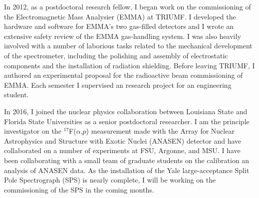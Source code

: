 {In %
 2012, as a postdoctoral research fellow, I began work on the commissioning of the Electromagnetic Mass Analysier (EMMA) %
 at TRIUMF. %
 I developed the hardware and software for 
 EMMA's two gas-filled detectors
and I wrote an extensive safety review of the EMMA gas-handling system. I was also heavily involved with a number of laborious tasks related to the mechanical development of the spectrometer, including the polishing and assembly of  electrostatic components and the installation of radiation shielding.
		Before leaving TRIUMF, I authored an experimental proposal for the radioactive beam commissioning of EMMA. Each semester I supervised an research project for an engineering student.
		
		
		In 2016, I joined the nuclear physics collaboration between Louisiana State and Florida State Universities as a senior postdoctoral researcher. I am the principle investigator on the $^{17}$F($\alpha$,$p$)  measurement made with the Array for Nuclear Astrophysics and Structure with Exotic Nuclei (ANASEN) detector and have collaborated on a number of experiments at FSU, Argonne, and MSU. I have been collaborating with a small team of graduate students on the calibration an analysis of ANASEN data. As the installation of the Yale large-acceptance Split Pole Spectrograph (SPS) is nearly complete, I will be working on the commissioning of the SPS in the coming months.


}
